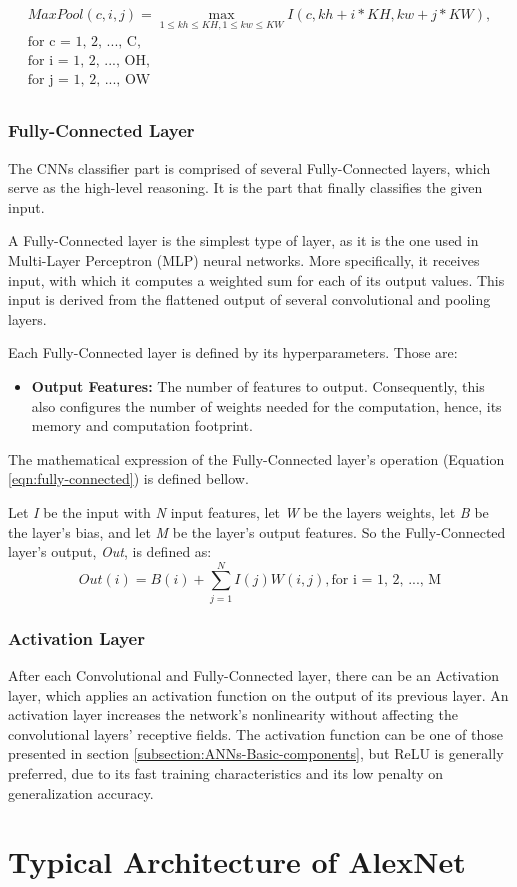 \begin{equation}
	\label{eqn:max-pooling}
	\begin{split}
		MaxPool(c, i, j) = \max_{1 \leq kh \leq KH, 1 \leq kw \leq KW}
		I(c, kh + i * KH, kw + j * KW),\\
		\mbox{for c = 1, 2, ..., C},\\
		\mbox{for i = 1, 2, ..., OH},\\
		\mbox{for j = 1, 2, ..., OW}\\
	\end{split}
\end{equation}

\subsubsection{Fully-Connected Layer}
The CNNs classifier part is comprised of several Fully-Connected layers, which serve as the high-level reasoning. It is the part that finally classifies the given input.

A Fully-Connected layer is the simplest type of layer, as it is the one used in Multi-Layer Perceptron (MLP) neural networks. More specifically, it receives input, with which it computes a weighted sum for each of its output values. This input is derived from the flattened output of several convolutional and pooling layers.

Each Fully-Connected layer is defined by its hyperparameters. Those are:
\begin{itemize}
	\item \textbf{Output Features:} The number of features to output. Consequently, this also configures the number of weights needed for the computation, hence, its memory and computation footprint.
\end{itemize}

The mathematical expression of the Fully-Connected layer's operation (Equation \ref{eqn:fully-connected}) is defined bellow.

Let \emph{I} be the input with \emph{N} input features, let \emph{W} be the layers weights, let \emph{B} be the layer's bias, and let \emph{M} be the layer's output features. So the Fully-Connected layer's output, \emph{Out}, is defined as:
\begin{equation}
	\label{eqn:fully-connected}
	Out(i) = B(i) + \sum_{j = 1}^{N} I(j)W(i, j), \mbox{for i = 1, 2, ..., M}
\end{equation}

\subsubsection{Activation Layer}
After each Convolutional and Fully-Connected layer, there can be an Activation layer, which applies an activation function on the output of its previous layer. An activation layer increases the network's nonlinearity without affecting the convolutional layers' receptive fields. The activation function can be one of those presented in section \ref{subsection:ANNs-Basic-components}, but ReLU is generally preferred, due to its fast training characteristics and its low penalty on generalization accuracy.

\section{Typical Architecture of AlexNet}
